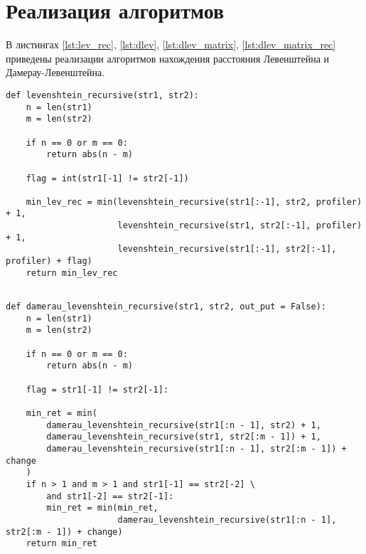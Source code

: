 \section{Реализация алгоритмов}

 В листингах \ref{lst:lev_rec}, \ref{lst:dlev}, \ref{lst:dlev_matrix}, \ref{lst:dlev_matrix_rec} приведены реализации алгоритмов нахождения расстояния Левенштейна и Дамерау-Левенштейна.

\begin{lstlisting}[label=lst:lev_rec,caption=Функция нахождения расстояния Левенштейна с использованием рекурсии.]
def levenshtein_recursive(str1, str2):
    n = len(str1)
    m = len(str2)

    if n == 0 or m == 0:
        return abs(n - m)

    flag = int(str1[-1] != str2[-1])

    min_lev_rec = min(levenshtein_recursive(str1[:-1], str2, profiler) + 1,
                      levenshtein_recursive(str1, str2[:-1], profiler) + 1,
                      levenshtein_recursive(str1[:-1], str2[:-1], profiler) + flag)
	return min_lev_rec
	
\end{lstlisting}

\begin{lstlisting}[label=lst:dlev,caption=Функция нахождения расстояния Дамерау-Левенштейна с использованием рекурсии.]
def damerau_levenshtein_recursive(str1, str2, out_put = False):
	n = len(str1)
	m = len(str2)
	
	if n == 0 or m == 0:
		return abs(n - m)
	
	flag = str1[-1] != str2[-1]:
	
	min_ret = min(
		damerau_levenshtein_recursive(str1[:n - 1], str2) + 1,
		damerau_levenshtein_recursive(str1, str2[:m - 1]) + 1,
		damerau_levenshtein_recursive(str1[:n - 1], str2[:m - 1]) + change
	)
	if n > 1 and m > 1 and str1[-1] == str2[-2] \
		and str1[-2] == str2[-1]:
		min_ret = min(min_ret,
		              damerau_levenshtein_recursive(str1[:n - 1], str2[:m - 1]) + change)
	return min_ret
	
\end{lstlisting}

